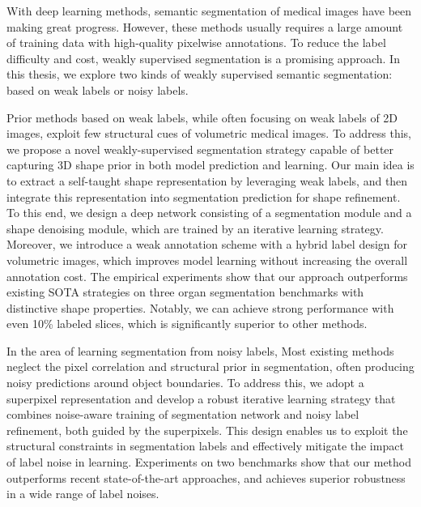 \begin{abstract*}[flattitle]
With deep learning methods, semantic segmentation of medical images have been making great progress. However, these methods usually requires a large amount of training data with high-quality pixelwise annotations. To reduce the label difficulty and cost, weakly supervised segmentation is a promising approach. In this thesis, we explore two kinds of weakly supervised semantic segmentation: based on weak labels or noisy labels.

Prior methods based on weak labels, while often focusing on weak labels of 2D images, exploit few structural cues of volumetric medical images. To address this, we propose a novel weakly-supervised segmentation strategy capable of better capturing 3D shape prior in both model prediction and learning. Our main idea is to extract a self-taught shape representation by leveraging weak labels, and then integrate this representation into segmentation prediction for shape refinement. To this end, we design a deep network consisting of a segmentation module and a shape denoising module, which are trained by an iterative learning strategy. Moreover, we introduce a weak annotation scheme with a hybrid label design for volumetric images, which improves model learning without increasing the overall annotation cost. The empirical experiments show that our approach outperforms existing SOTA strategies on three organ segmentation benchmarks with distinctive shape properties. Notably, we can achieve strong performance with even 10\% labeled slices, which is significantly superior to other methods. 

In the area of learning segmentation from noisy labels, Most existing methods neglect the pixel correlation and structural prior in segmentation, often producing noisy predictions around object boundaries. To address this, we adopt a superpixel representation and develop a robust iterative learning strategy that combines noise-aware training of segmentation network and noisy label refinement, both guided by the superpixels. This design enables us to exploit the structural constraints in segmentation labels and effectively mitigate the impact of label noise in learning. Experiments on two benchmarks show that our method outperforms recent state-of-the-art approaches, and achieves superior robustness in a wide range of label noises.


\end{abstract*}